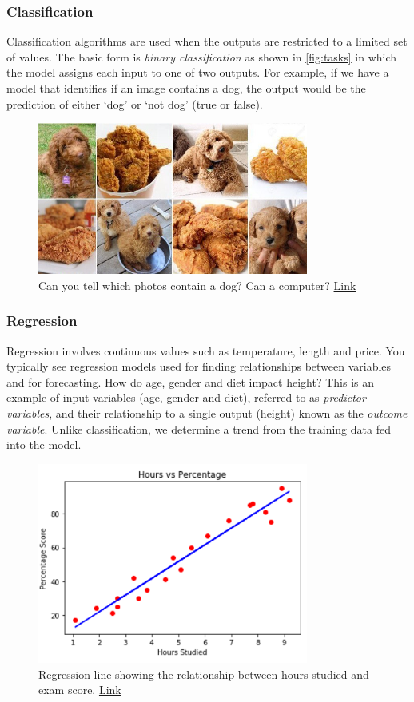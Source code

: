 \documentclass{article}
\begin{document}
\subsubsection{Classification}
Classification algorithms are used when the outputs are restricted to a limited set of values. The basic form is \textit{binary classification} as shown in \ref{fig:tasks} in which the model assigns each input to one of two outputs. For example, if we have a model that identifies if an image contains a dog, the output would be the prediction of either `dog' or `not dog' (true or false).  

\begin{figure}[H]
    \centering
    \includegraphics[width=3.5in]{dogs.jpg}
    \caption{Can you tell which photos contain a dog? Can a computer? \href{https://www.npr.org/sections/thesalt/2016/03/11/470084215/canine-or-cuisine-this-photo-meme-is-fetching}{Link}}
    \label{fig:dogs}
\end{figure}

\subsubsection{Regression}
Regression involves continuous values such as temperature, length and price. You typically see regression models used for finding relationships between variables and for forecasting. How do age, gender and diet impact height? This is an example of input variables (age, gender and diet), referred to as \textit{predictor variables}, and their relationship to a single output (height) known as the \textit{outcome variable}. Unlike classification, we determine a trend from the training data fed into the model.  

\begin{figure}[H]
    \centering
    \includegraphics[width=3.5in]{regression.png}
    \caption{Regression line showing the relationship between hours studied and exam score. \href{https://stackabuse.com/linear-regression-in-python-with-scikit-learn/}{Link}}
    \label{fig:regression}
\end{figure}
\end{document}
